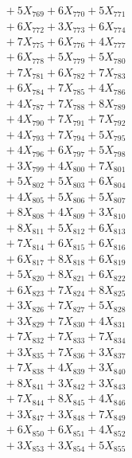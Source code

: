 \documentclass[a4paper,10pt]{article}
\begin{document}
{\begin{align}
&\;  + 5 X_{769} + 6 X_{770} + 5 X_{771} \\[0.3ex]
&\;  + 6 X_{772} + 3 X_{773} + 6 X_{774} \\[0.3ex]
&\;  + 7 X_{775} + 6 X_{776} + 4 X_{777} \\[0.3ex]
&\;  + 6 X_{778} + 5 X_{779} + 5 X_{780} \\[0.3ex]
&\;  + 7 X_{781} + 6 X_{782} + 7 X_{783} \\[0.3ex]
&\;  + 6 X_{784} + 7 X_{785} + 4 X_{786} \\[0.3ex]
&\;  + 4 X_{787} + 7 X_{788} + 8 X_{789} \\[0.5ex]\allowbreak
&\;  + 4 X_{790} + 7 X_{791} + 7 X_{792} \\[0.3ex]
&\;  + 4 X_{793} + 7 X_{794} + 5 X_{795} \\[0.3ex]
&\;  + 4 X_{796} + 6 X_{797} + 5 X_{798} \\[0.3ex]
&\;  + 3 X_{799} + 4 X_{800} + 7 X_{801} \\[0.3ex]
&\;  + 5 X_{802} + 5 X_{803} + 6 X_{804} \\[0.3ex]
&\;  + 4 X_{805} + 5 X_{806} + 5 X_{807} \\[0.3ex]
&\;  + 8 X_{808} + 4 X_{809} + 3 X_{810} \\[0.3ex]
&\;  + 8 X_{811} + 5 X_{812} + 6 X_{813} \\[0.3ex]
&\;  + 7 X_{814} + 6 X_{815} + 6 X_{816} \\[0.3ex]
&\;  + 6 X_{817} + 8 X_{818} + 6 X_{819} \\[0.5ex]\allowbreak
&\;  + 5 X_{820} + 8 X_{821} + 6 X_{822} \\[0.3ex]
&\;  + 6 X_{823} + 7 X_{824} + 8 X_{825} \\[0.3ex]
&\;  + 3 X_{826} + 7 X_{827} + 5 X_{828} \\[0.3ex]
&\;  + 3 X_{829} + 7 X_{830} + 4 X_{831} \\[0.3ex]
&\;  + 7 X_{832} + 7 X_{833} + 7 X_{834} \\[0.3ex]
&\;  + 3 X_{835} + 7 X_{836} + 3 X_{837} \\[0.3ex]
&\;  + 7 X_{838} + 4 X_{839} + 3 X_{840} \\[0.3ex]
&\;  + 8 X_{841} + 3 X_{842} + 3 X_{843} \\[0.3ex]
&\;  + 7 X_{844} + 8 X_{845} + 4 X_{846} \\[0.3ex]
&\;  + 3 X_{847} + 3 X_{848} + 7 X_{849} \\[0.5ex]\allowbreak
&\;  + 6 X_{850} + 6 X_{851} + 4 X_{852} \\[0.3ex]
&\;  + 3 X_{853} + 3 X_{854} + 5 X_{855} \\[0.3ex]

\end{align}}
\end{document}
